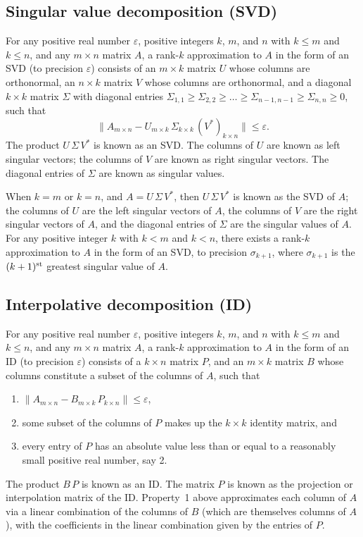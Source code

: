 \documentclass[letterpaper,12pt]{article}
\def\epsilon{\varepsilon}
\def\st{{\hbox{\scriptsize{\rm st}}}}
\begin{document}
\subsection{Singular value decomposition (SVD)}

For any positive real number $\epsilon$,
positive integers $k$, $m$, and $n$ with $k \le m$ and $k \le n$,
and any $m \times n$ matrix $A$,
a rank-$k$ approximation to $A$ in the form of an SVD
(to precision $\epsilon$) consists of an $m \times k$ matrix $U$
whose columns are orthonormal, an $n \times k$ matrix $V$
whose columns are orthonormal, and a diagonal $k \times k$ matrix
$\Sigma$ with diagonal entries
$\Sigma_{1,1} \ge \Sigma_{2,2} \ge \dots \ge \Sigma_{n-1,n-1}
                                         \ge \Sigma_{n,n} \ge 0$,
such that
%
\begin{equation}
\| A_{m \times n} - U_{m \times k} \, \Sigma_{k \times k}
                 \, (V^*)_{k \times n} \| \le \epsilon.
\end{equation}
%
The product $U \, \Sigma \, V^*$ is known as an SVD.
The columns of $U$ are known as left singular vectors;
the columns of $V$ are known as right singular vectors.
The diagonal entries of $\Sigma$ are known as singular values.

When $k = m$ or $k = n$, and $A = U \, \Sigma \, V^*$,
then $U \, \Sigma \, V^*$ is known as the SVD
of $A$; the columns of $U$ are the left singular vectors of $A$,
the columns of $V$ are the right singular vectors of $A$,
and the diagonal entries of $\Sigma$ are the singular values of $A$.
For any positive integer $k$ with $k < m$ and $k < n$,
there exists a rank-$k$ approximation to $A$ in the form of an SVD,
to precision $\sigma_{k+1}$, where $\sigma_{k+1}$ is the $(k+1)^\st$
greatest singular value of $A$.


\subsection{Interpolative decomposition (ID)}

For any positive real number $\epsilon$,
positive integers $k$, $m$, and $n$ with $k \le m$ and $k \le n$,
and any $m \times n$ matrix $A$,
a rank-$k$ approximation to $A$ in the form of an ID
(to precision $\epsilon$) consists of a $k \times n$ matrix $P$,
and an $m \times k$ matrix $B$ whose columns constitute a subset
of the columns of $A$, such that
%
\begin{enumerate}
\item $\| A_{m \times n} - B_{m \times k} \, P_{k \times n} \|
      \le \epsilon$,
\item some subset of the columns of $P$ makes up the $k \times k$
      identity matrix, and
\item every entry of $P$ has an absolute value less than or equal
      to a reasonably small positive real number, say 2.
\end{enumerate}
%
The product $B \, P$ is known as an ID.
The matrix $P$ is known as the projection or interpolation matrix
of the ID. Property~1 above approximates each column of $A$
via a linear combination of the columns of $B$
(which are themselves columns of $A$), with the coefficients
in the linear combination given by the entries of $P$.
\end{document}
